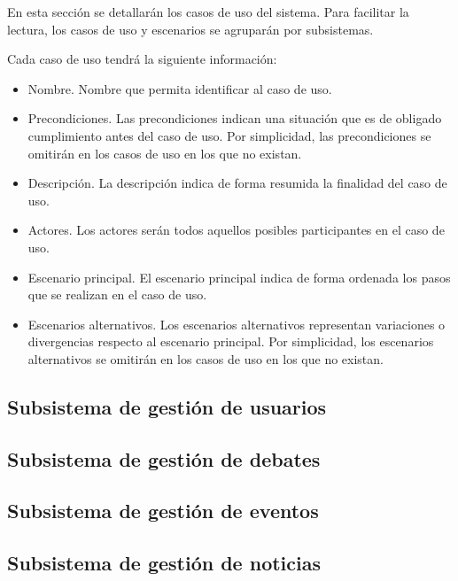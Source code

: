En esta sección se detallarán los casos de uso del sistema.  Para facilitar la lectura, los casos de uso y escenarios se agruparán por subsistemas.

Cada caso de uso tendrá la siguiente información:
\begin{itemize}
\item Nombre.  Nombre que permita identificar al caso de uso.
\item Precondiciones.  Las precondiciones indican una situación que es de obligado cumplimiento antes del caso de uso.  Por simplicidad, las precondiciones se omitirán en los casos de uso en los que no existan.
\item Descripción.  La descripción indica de forma resumida la finalidad del caso de uso.
\item Actores.  Los actores serán todos aquellos posibles participantes en el caso de uso.
\item Escenario principal.  El escenario principal indica de forma ordenada los pasos que se realizan en el caso de uso.
\item Escenarios alternativos.  Los escenarios alternativos representan variaciones o divergencias respecto al escenario principal.  Por simplicidad, los escenarios alternativos se omitirán en los casos de uso en los que no existan.
\end{itemize}


\subsection{Subsistema de gestión de usuarios}
\label{casos_uso_subsistema_usuarios}


\subsection{Subsistema de gestión de debates}
\label{casos_uso_subsistema_debates}


\subsection{Subsistema de gestión de eventos}
\label{casos_uso_subsistema_eventos}


\subsection{Subsistema de gestión de noticias}
\label{casos_uso_subsistema_noticias}


